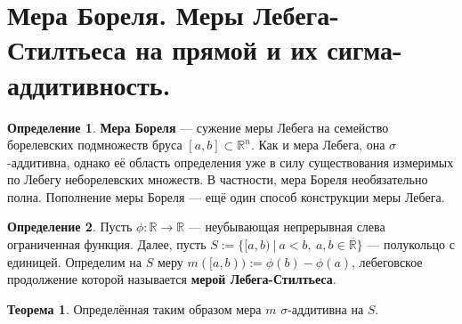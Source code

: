\documentclass[11pt,a4paper]{report}
\def\Real{\mathbb{R}}
\theoremstyle{definition}
\theoremstyle{definition}
\newtheorem{theorem}{Теорема}[section]
\theoremstyle{definition}
\newtheorem{definition}{Определение}[section]
\begin{document}
	\section{Мера Бореля. Меры Лебега-Стилтьеса на прямой и их сигма-аддитивность.}
	\begin{definition}
		\textbf{Мера Бореля} — сужение меры Лебега на семейство борелевских подмножеств бруса $ [a, b] \subset \Real^{n} $.
		Как и мера Лебега, она $ \sigma $-аддитивна, однако её область определения уже в силу существования измеримых по Лебегу неборелевских множеств. В частности, мера Бореля необязательно полна. Пополнение меры Бореля — ещё один способ конструкции меры Лебега. 
	\end{definition}
	\begin{definition}
		Пусть $ \phi: \Real \to \Real $ — неубывающая непрерывная слева ограниченная функция. Далее, пусть $ S := \{[a, b)\ |\ a < b,\ a, b \in \overline{\Real} \} $ — полукольцо с единицей. Определим на $ S $ меру $ m([a, b)) := \phi(b) - \phi(a) $, лебеговское продолжение которой называется \textbf{мерой Лебега-Стилтьеса}.
	\end{definition}
	\begin{theorem}
		Определённая таким образом мера $ m $ $ \sigma $-аддитивна на $ S $.
	\end{theorem}
\end{document}
